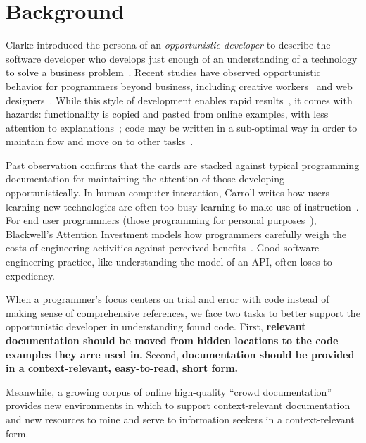 \documentclass[12pt]{memoir}
\begin{document}

\section{Background}

Clarke introduced the persona of an \emph{opportunistic developer} to describe the software developer who develops just enough of an understanding of a technology to solve a business problem~\cite{clarke_what_2007}.
Recent studies have observed opportunistic behavior for programmers beyond business, including creative workers~\cite{brandt_opportunistic_2008} and web designers~\cite{dorn_learning_2010}.
While this style of development enables rapid results~\cite{brandt_opportunistic_2008}, it comes with hazards:
functionality is copied and pasted from online examples, with less attention to explanations~\cite{brandt_two_2009};
code may be written in a sub-optimal way in order to maintain flow and move on to other tasks~\cite{brandt_opportunistic_2008}.

Past observation confirms that the cards are stacked against typical programming documentation for maintaining the attention of those developing opportunistically.
In human-computer interaction, Carroll writes how users learning new technologies are often too busy learning to make use of instruction~\cite{carroll_nurnberg_1990}.
For end user programmers (those programming for personal purposes~\cite{ko_state_2011}), Blackwell's Attention Investment models how programmers carefully weigh the costs of engineering activities against perceived benefits~\cite{blackwell_psychological_2006}.
Good software engineering practice, like understanding the model of an API, often loses to expediency.

When a programmer's focus centers on trial and error with code instead of making sense of comprehensive references, we face two tasks to better support the opportunistic developer in understanding found code.
First, \textbf{relevant documentation should be moved from hidden locations to the code examples they arre used in.}
Second, \textbf{documentation should be provided in a context-relevant, easy-to-read, short form.}

Meanwhile, a growing corpus of online high-quality ``crowd documentation''~\cite{parnin_crowd_2012} provides new environments in which to support context-relevant documentation and new resources to mine and serve to information seekers in a context-relevant form.
\end{document}
